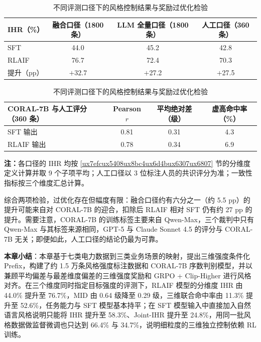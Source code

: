 \documentclass[fontset=fandol,type=master,campus=shenzhen,etitleauto=true]{hithesisbook}
\begin{document}
\begin{table}[htbp]
\centering
\caption{不同评测口径下的风格控制结果与奖励过优化检验}
\label{tab:rm-overopt}
\small
\renewcommand{\arraystretch}{1.15}
\begin{tabular}{l c c c}
\toprule
\textbf{IHR（\%）} & \textbf{融合口径（1800 条）} & \textbf{LLM 全量口径（1800 条）} & \textbf{人工口径（360 条）} \\
\midrule
SFT & 44.0 & 45.2 & 42.8 \\
RLAIF & 76.7 & 72.4 & 70.3 \\
提升（pp） & $+32.7$ & $+$27.2 & $+$27.5 \\
\bottomrule
\end{tabular}

\vspace{0.3cm}
\begin{tabular}{l c c c}
\toprule
\textbf{CORAL-7B 与人工评分（360 条）} & \textbf{Pearson $r$} & \textbf{平均绝对差（级）} & \textbf{虚高命中率（\%）} \\
\midrule
SFT 输出 & 0.81 & 0.31 & 4.3 \\
RLAIF 输出 & 0.78 & 0.34 & 6.9 \\
\bottomrule
\end{tabular}

\vspace{0.2cm}
\parbox{\linewidth}{\small \textbf{注：}各口径的 IHR 均按 \ref{ux7efcux5408ux8bc4ux6d4bux6307ux6807} 节的分维度定义计算并取 9 个子项平均；人工口径以 3 位标注人员的共识评分为准；一致性指标按三个维度汇总计算。}
\end{table}

综合两项检验，过优化存在但幅度有限：融合口径约有六分之一（约 5.5 pp）的提升可能来自对 CORAL-7B 的迎合，扣除后 RLAIF 相对 SFT 仍有约 27 pp 的提升。需要注意，CORAL-7B 的训练标签主要来自 Qwen-Max，三个裁判中只有 Qwen-Max 与其标签来源相同，GPT-5 与 Claude Sonnet 4.5 的评分与 CORAL-7B 无关；即便如此，人工口径的结论仍最为可靠。

\vspace{0.5cm}
\noindent \textbf{本章小结}：本章基于七类电力数据到三类业务场景的映射，提出三维强度条件化 Prefix，构建了约 1.5 万条风格强度标注数据和 CORAL-7B 序数判别模型，并以兼顾平均偏差与最差维度偏差的三维强度奖励和 GRPO + Clip-Higher 进行风格对齐。在三个维度同时指定目标强度的评测下，RLAIF 模型的分维度 IHR 由 44.0\% 提升至 76.7\%，MID 由 0.64 级降至 0.29 级，三维联合命中率由 11.3\% 提升至 52.6\%，任务能力与 SFT 模型基本持平；在 SFT 模型输入中直接加入自然语言风格说明只能将 IHR 提升至 58.3\%、Joint-IHR 提升至 24.8\%，用同一批风格数据做监督微调也只达到 66.4\% 与 34.7\%，说明细粒度的三维独立控制依赖 RL 训练。
\end{document}

